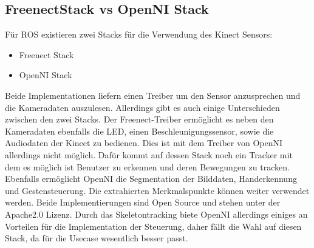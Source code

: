 \subsection{FreenectStack vs OpenNI Stack}
Für ROS existieren zwei Stacks für die Verwendung des Kinect Sensors:
\begin{itemize}
	\item Freenect Stack\cite{freenect}
	\item OpenNI Stack\cite{openni}
\end{itemize}
Beide Implementationen liefern einen Treiber um den Sensor anzusprechen und die Kameradaten auszulesen. Allerdings gibt es auch einige Unterschieden zwischen den zwei Stacks. Der Freenect-Treiber ermöglicht es neben den Kameradaten ebenfalls die LED, einen Beschleunigungssensor, sowie die Audiodaten der Kinect zu bedienen.\cite{freenect} Dies ist mit dem Treiber von OpenNI allerdings nicht möglich. Dafür kommt auf dessen Stack noch ein Tracker mit dem es möglich ist Benutzer zu erkennen und deren Bewegungen zu tracken. Ebenfalls ermöglicht OpenNI die Segmentation der Bilddaten, Handerkennung und Gestensteuerung. Die extrahierten Merkmalspunkte können weiter verwendet werden. Beide Implementierungen sind Open Source und stehen unter der Apache2.0 Lizenz\cite{opennilicense}\cite{freenect}. Durch das Skeletontracking biete OpenNI allerdings einiges an Vorteilen für die Implementation der Steuerung, daher fällt die Wahl auf diesen Stack, da für die Usecase wesentlich besser passt.

